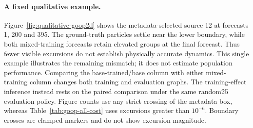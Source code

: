 \begin{figure}[t]
\label{fig:goop-exposure-placement}
\end{figure}

\paragraph{A fixed qualitative example.}
Figure~\ref{fig:qualitative-goop2d} shows the metadata-selected source 12 at
forecasts 1, 200 and 395. The ground-truth particles settle near the lower
boundary, while both mixed-training forecasts retain elevated groups at the
final forecast. Thus fewer visible excursions do not establish physically
accurate dynamics. This single example illustrates the remaining mismatch;
it does not estimate population performance. Comparing the base-trained/base
column with either mixed-training column changes both training and evaluation
graphs. The training-effect inference instead rests on the paired comparison
under the same random25 evaluation policy. Figure counts use any strict
crossing of the metadata box, whereas Table~\ref{tab:goop-all-cost} uses
excursions greater than $10^{-6}$. Boundary crosses are clamped markers and do
not show excursion magnitude.

